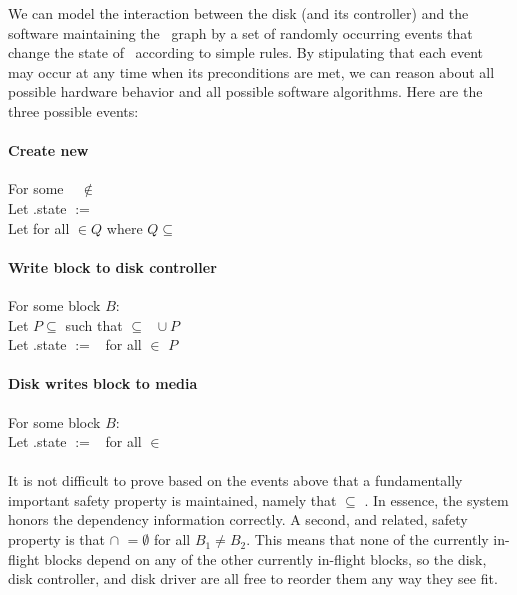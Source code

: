 We can model the interaction between the disk (and its controller) and the
software maintaining the \chdesc\ graph by a set of randomly occurring events
that change the state of \chdescs\ according to simple rules. By stipulating
that each event may occur at any time when its preconditions are met, we can
reason about all possible hardware behavior and all possible software
algorithms. Here are the three possible events:

\paragraph{Create new \chdesc}
For some \chdesc\  $\not\in$ \ChAll\: \\
Let .state $:=$ \statenone \\
Let  for all  $\in Q$ where $Q \subseteq$ \ChAll %

\paragraph{Write block to disk controller}
For some block $B$: \\
Let $P \subseteq$  such that  $\subseteq$ \ChDisk\ $\cup\ P$ \\
Let .state $:=$ \stateinf\ for all  $\in$ $P$

\paragraph{Disk writes block to media}
For some block $B$: \\
Let .state $:=$ \statedisk\ for all  $\in$ 

\paragraph{} It is not difficult to prove based on the events above that a
fundamentally important safety property is maintained, namely that
\BeforeS{\ChDisk} $\subseteq$ \ChDisk. In essence, the system honors the
dependency information correctly. A second, and related, safety property is that
 $\cap$  $= \emptyset$ for all $B_1 \neq B_2$.
This means that none of the currently in-flight blocks depend on any of the
other currently in-flight blocks, so the disk, disk controller, and disk driver
are all free to reorder them any way they see fit.

